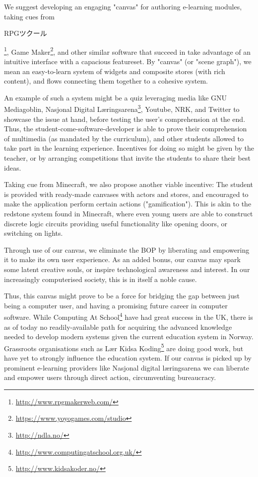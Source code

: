 We suggest developing an engaging "canvas"  for authoring e-learning modules, 
taking cues from 
\begin{CJK}{UTF8}{min}RPGツクール\end{CJK}\footnote{\url{http://www.rpgmakerweb.com/}}, 
Game Maker\footnote{\url{https://www.yoyogames.com/studio}}, and other similar 
software that succeed in take advantage of an intuitive interface with a 
capacious featureset. By "canvas" (or "scene graph"), we mean an easy-to-learn 
system of widgets and composite stores (with rich content), and flows 
connecting them together to a cohesive system. 

An example of such a system might be a quiz leveraging media like GNU 
Mediagoblin, Nasjonal Digital Læringsarena\footnote{\url{http://ndla.no/}}, 
Youtube, NRK, and Twitter to showcase the issue at hand, before testing the 
user's comprehension at the end. Thus, the student-come-software-developer is 
able to prove their comprehension of multimedia (as mandated by the 
curriculum), and other students allowed to take part in the learning 
experience. Incentives for doing so might be given by the teacher, or by 
arranging competitions that invite the students to share their best ideas.

Taking cue from Minecraft, we also propose another viable incentive: The 
student is provided with ready-made canvases with actors and stores, and 
encouraged to make the application perform certain actions ("gamification"). 
This is akin to the redstone system found in Minecraft, where even young users 
are able to construct discrete logic circuits providing useful functionality 
like opening doors, or switching on lights\cite{brand2013crafting}.

Through use of our canvas, we eliminate the BOP by liberating and empowering 
it to make its own user experience. As an added bonus, our canvas may spark 
some latent creative souls, or inspire technological awareness and interest. 
In our increasingly computerised society, this is in itself a noble cause. 

Thus, this canvas might prove to be a force for bridging the gap between just 
being a computer user, and having a promising future career in computer 
software. While Computing At 
School\footnote{\url{http://www.computingatschool.org.uk/}} have had great 
success in the UK, there is as of today no readily-available path for 
acquiring the advanced knowledge needed to develop modern systems given the 
current education system in Norway. Grassroots organisations such as Lær Kidsa 
Koding\footnote{\url{http://www.kidsakoder.no/}} are doing good work, but have 
yet to strongly influence the education system. If our canvas is picked up by 
prominent e-learning providers like Nasjonal digital læringsarena we can 
liberate and empower users through direct action, circumventing bureaucracy.

